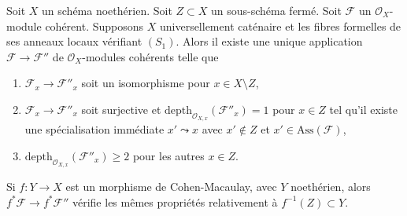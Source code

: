 \begin{lemma}
\label{lemma-make-S2-along-Z}
Soit $X$ un schéma noethérien. Soit $Z \subset X$ un sous-schéma fermé. Soit $\mathcal{F}$ un $\mathcal{O}_X$-module cohérent. Supposons $X$ universellement caténaire et les fibres formelles de ses anneaux locaux vérifiant $(S_1)$. Alors il existe une unique application $\mathcal{F} \to \mathcal{F}''$ de $\mathcal{O}_X$-modules cohérents telle que
\begin{enumerate}
\item $\mathcal{F}_x \to \mathcal{F}''_x$ soit un isomorphisme pour $x \in X \setminus Z$,
\item $\mathcal{F}_x \to \mathcal{F}''_x$ soit surjective et $\text{depth}_{\mathcal{O}_{X, x}}(\mathcal{F}''_x) = 1$ pour $x \in Z$ tel qu'il existe une spécialisation immédiate $x' \leadsto x$ avec $x' \not \in Z$ et $x' \in \text{Ass}(\mathcal{F})$,
\item $\text{depth}_{\mathcal{O}_{X, x}}(\mathcal{F}''_x) \geq 2$ pour les autres $x \in Z$.
\end{enumerate}
Si $f : Y \to X$ est un morphisme de Cohen-Macaulay, avec $Y$ noethérien, alors $f^*\mathcal{F} \to f^*\mathcal{F}''$ vérifie les mêmes propriétés relativement à $f^{-1}(Z) \subset Y$.
\end{lemma}

